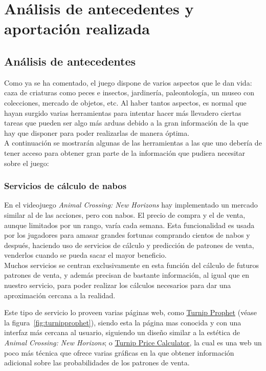 \chapter{An\'alisis de antecedentes y aportaci\'on realizada}\label{analanteced}

\section{Análisis de antecedentes}

Como ya se ha comentado, el juego dispone de varios aspectos que le dan vida: caza de criaturas como peces e insectos, jardinería, paleontología, un museo con colecciones, mercado de objetos, etc. Al haber tantos aspectos, es normal que hayan surgido varias herramientas para intentar hacer más llevadero ciertas tareas que pueden ser algo más arduas debido a la gran información de la que hay que disponer para poder realizarlas de manera óptima.\\

A continuación se mostrarán algunas de las herramientas a las que uno debería de tener acceso para obtener gran parte de la información que pudiera necesitar sobre el juego:

\subsection{Servicios de cálculo de nabos}

En el videojuego \textit{Animal Crossing: New Horizons} hay implementado un mercado similar al de las acciones, pero con nabos. El precio de compra y el de venta, aunque limitados por un rango, varía cada semana. Esta funcionalidad es usada por los jugadores para amasar grandes fortunas comprando cientos de nabos y después, haciendo uso de servicios de cálculo y predicción de patrones de venta, venderlos cuando se pueda sacar el mayor beneficio.\\

Muchos servicios se centran exclusivamente en esta función del cálculo de futuros patrones de venta, y además precisan de bastante información, al igual que en nuestro servicio, para poder realizar los cálculos necesarios para dar una aproximación cercana a la realidad.\\


\clearpage

Este tipo de servicio lo proveen varias páginas web, como \href{https://turnipprophet.io/}{Turnip Prophet} {(v\'ease la figura~\ref{fig:turnipprophet})}, siendo esta la página mas conocida y con una interfaz más cercana al usuario, siguiendo un diseño similar a la estética de \textit{Animal Crossing: New Horizons}; o \href{https://artem6.github.io/acnh_turnips/}{Turnip Price Calculator}, la cual es una web un poco más técnica que ofrece varias gráficas en la que obtener información adicional sobre las probabilidades de los patrones de venta.\\


